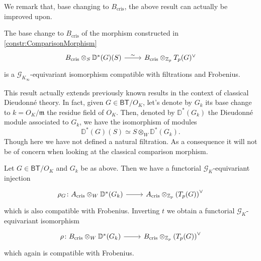 \noindent
We remark that, base changing to $B_{\mathrm{cris}}$, the above result can actually be
improved upon.
\begin{thm}[]
	The base change to $B_{\mathrm{cris}}$ of the morphism
	constructed in \cref{constr:ComparisonMorphism}
	\begin{equation*}
	\begin{tikzcd}[row sep = 0ex
		,/tikz/column 1/.append style={anchor=base east}
		,/tikz/column 2/.append style={anchor=base west}]
		B_{\mathrm{cris}} \otimes_S \mathbb{D}^*(G)(S) \arrow[r, "\sim", rightarrow] &
		B_{\mathrm{cris}} \otimes_{\mathbb{Z}_{p}} T_p(G)^\vee
	\end{tikzcd}
	\end{equation*} 
	is a $\mathscr{G}_{K_\infty}$-equivariant isomorphism compatible with filtrations and Frobenius.
\end{thm}


\begin{rem}[]
	This result actually extends previously known 
	results in the context of classical Dieudonné theory.
	In fact, given $G \in \mathsf{BT}/O_K$, let's denote by $G_k$
	its base change to $k = O_K / \mathfrak{m}$ the residue field of $O_K$.
	Then, denoted by $\mathbb{D}^*(G_k)$ the Dieudonné module associated to
	$G_k$, we have the isomorphism of modules
	\begin{equation*}
		\mathbb{D}^*(G)(S) \simeq S \otimes_W \mathbb{D}^*(G_k)
	.\end{equation*}
	Though here we have not defined a natural filtration.
	As a consequence it will not be of concern when looking at the classical
	comparison morphism.
\end{rem}


\begin{thm}[]
	Let $G \in \mathsf{BT}/O_K$ and $G_k$ be as above.
	Then we have a functorial $\mathscr{G}_K$-equivariant injection
	\begin{equation*}
	\begin{tikzcd}[row sep = 0ex
		,/tikz/column 1/.append style={anchor=base east}
		,/tikz/column 2/.append style={anchor=base west}]
		\rho_G\colon 
		A_{\mathrm{cris}} \otimes_W \mathbb{D}^*(G_k)
		\arrow[r, "", rightarrow] &
		A_{\mathrm{cris}} \otimes_{\mathbb{Z}_{p}} \left( T_p(G) \right)^\vee
	\end{tikzcd}
	\end{equation*} 
	which is also compatible with Frobenius.
	Inverting $t$ we obtain a functorial $\mathscr{G}_{K}$-equivariant isomorphism
	\begin{equation*}
	\begin{tikzcd}[row sep = 0ex
		,/tikz/column 1/.append style={anchor=base east}
		,/tikz/column 2/.append style={anchor=base west}]
		\rho\colon B_{\mathrm{cris}} \otimes_W \mathbb{D}^*(G_k)
		\arrow[r, "", rightarrow] &
		B_{\mathrm{cris}} \otimes_{\mathbb{Z}_{p}} \left( T_p(G) \right)^\vee
	\end{tikzcd}
	\end{equation*} 
	which again is compatible with Frobenius.
\end{thm}


